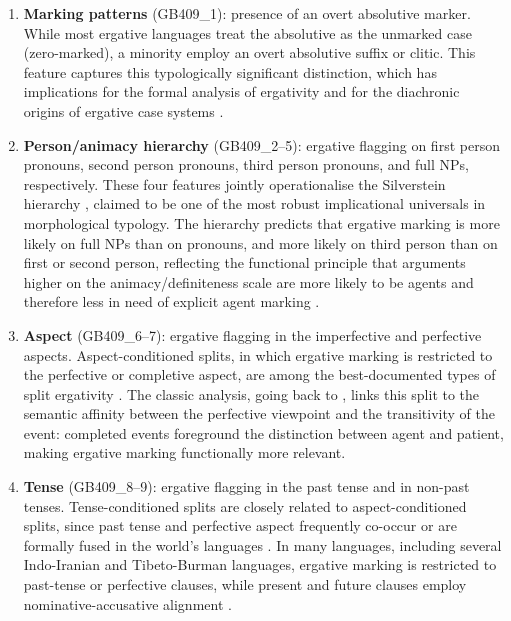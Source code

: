 \documentclass[12pt,a4paper]{article}
\begin{document}
\begin{enumerate}
\item \textbf{Marking patterns} (GB409\_1): presence of an overt absolutive marker. While most ergative languages treat the absolutive as the unmarked case (zero-marked), a minority employ an overt absolutive suffix or clitic. This feature captures this typologically significant distinction, which has implications for the formal analysis of ergativity and for the diachronic origins of ergative case systems \cite{mcgregor2009}.

\item \textbf{Person/animacy hierarchy} (GB409\_2--5): ergative flagging on first person pronouns, second person pronouns, third person pronouns, and full NPs, respectively. These four features jointly operationalise the Silverstein hierarchy \cite{silverstein1976}, claimed to be one of the most robust implicational universals in morphological typology. The hierarchy predicts that ergative marking is more likely on full NPs than on pronouns, and more likely on third person than on first or second person, reflecting the functional principle that arguments higher on the animacy/definiteness scale are more likely to be agents and therefore less in need of explicit agent marking \cite{comrie1989,aissen2003}.

\item \textbf{Aspect} (GB409\_6--7): ergative flagging in the imperfective and perfective aspects. Aspect-conditioned splits, in which ergative marking is restricted to the perfective or completive aspect, are among the best-documented types of split ergativity \cite{dixon1994}. The classic analysis, going back to \cite{dixon1979}, links this split to the semantic affinity between the perfective viewpoint and the transitivity of the event: completed events foreground the distinction between agent and patient, making ergative marking functionally more relevant.

\item \textbf{Tense} (GB409\_8--9): ergative flagging in the past tense and in non-past tenses. Tense-conditioned splits are closely related to aspect-conditioned splits, since past tense and perfective aspect frequently co-occur or are formally fused in the world's languages \cite{bybee1994}. In many languages, including several Indo-Iranian and Tibeto-Burman languages, ergative marking is restricted to past-tense or perfective clauses, while present and future clauses employ nominative-accusative alignment \cite{verbeke2013}.


\end{enumerate}
\end{document}
